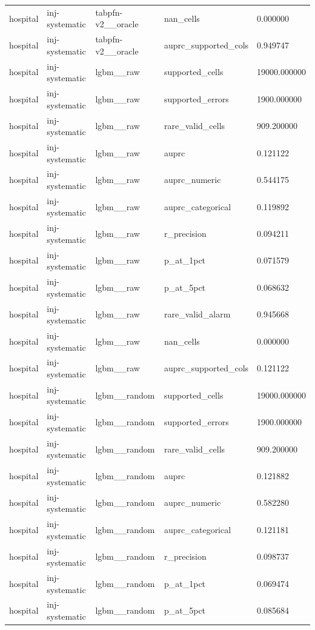 \begin{tabular}{lllll}
hospital & inj-systematic & tabpfn-v2\_\_oracle & nan\_cells & 0.000000 \\
hospital & inj-systematic & tabpfn-v2\_\_oracle & auprc\_supported\_cols & 0.949747 \\
hospital & inj-systematic & lgbm\_\_raw & supported\_cells & 19000.000000 \\
hospital & inj-systematic & lgbm\_\_raw & supported\_errors & 1900.000000 \\
hospital & inj-systematic & lgbm\_\_raw & rare\_valid\_cells & 909.200000 \\
hospital & inj-systematic & lgbm\_\_raw & auprc & 0.121122 \\
hospital & inj-systematic & lgbm\_\_raw & auprc\_numeric & 0.544175 \\
hospital & inj-systematic & lgbm\_\_raw & auprc\_categorical & 0.119892 \\
hospital & inj-systematic & lgbm\_\_raw & r\_precision & 0.094211 \\
hospital & inj-systematic & lgbm\_\_raw & p\_at\_1pct & 0.071579 \\
hospital & inj-systematic & lgbm\_\_raw & p\_at\_5pct & 0.068632 \\
hospital & inj-systematic & lgbm\_\_raw & rare\_valid\_alarm & 0.945668 \\
hospital & inj-systematic & lgbm\_\_raw & nan\_cells & 0.000000 \\
hospital & inj-systematic & lgbm\_\_raw & auprc\_supported\_cols & 0.121122 \\
hospital & inj-systematic & lgbm\_\_random & supported\_cells & 19000.000000 \\
hospital & inj-systematic & lgbm\_\_random & supported\_errors & 1900.000000 \\
hospital & inj-systematic & lgbm\_\_random & rare\_valid\_cells & 909.200000 \\
hospital & inj-systematic & lgbm\_\_random & auprc & 0.121882 \\
hospital & inj-systematic & lgbm\_\_random & auprc\_numeric & 0.582280 \\
hospital & inj-systematic & lgbm\_\_random & auprc\_categorical & 0.121181 \\
hospital & inj-systematic & lgbm\_\_random & r\_precision & 0.098737 \\
hospital & inj-systematic & lgbm\_\_random & p\_at\_1pct & 0.069474 \\
hospital & inj-systematic & lgbm\_\_random & p\_at\_5pct & 0.085684 \\

\end{tabular}
